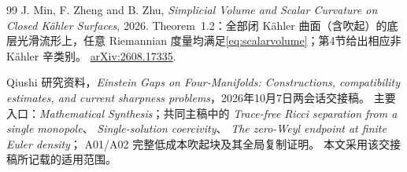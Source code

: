 \documentclass[11pt,a4paper]{article}
\newcommand{\Ka}{K{\latin\"a}hler}
\theoremstyle{definition}
\numberwithin{equation}{section}
\begin{document}
\begin{thebibliography}{99}
J. Min, F. Zheng and B. Zhu,
\emph{Simplicial Volume and Scalar Curvature on Closed K{\latin\"a}hler Surfaces}, 2026.
Theorem~1.2：全部闭 \Ka{} 曲面（含吹起）的底层光滑流形上，任意 Riemannian 度量均满足\eqref{eq:scalarvolume}；第4节给出相应非 \Ka{} 辛类别。
\href{https://arxiv.org/abs/2608.17335}{arXiv:2608.17335}.

Qiushi 研究资料，\emph{Einstein Gaps on Four-Manifolds: Constructions, compatibility estimates, and current sharpness problems}，2026年10月7日两会话交接稿。
主要入口：\emph{Mathematical Synthesis}；共同主稿中的
\emph{Trace-free Ricci separation from a single monopole}、
\emph{Single-solution coercivity}、
\emph{The zero-Weyl endpoint at finite Euler density}；
A01/A02 完整低成本吹起块及其全局复制证明。
本文采用该交接稿所记载的适用范围。
\end{thebibliography}
\end{document}
